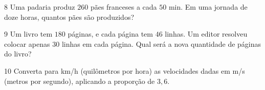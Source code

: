 




\bigskip

\num{8} Uma padaria produz $260$ pães franceses a cada $50$ min. Em uma jornada
de doze horas, quantos pães são produzidos?

\bigskip







\bigskip

\num{9} Um livro tem $180$ páginas, e cada página tem $46$ linhas. Um editor
resolveu colocar apenas $30$ linhas em cada página. Qual será a nova
quantidade de páginas do livro?

\bigskip








\bigskip

\num{10} Converta para km/h (quilômetros por hora) as velocidades
dadas em m/s (metros por segundo), aplicando a proporção de $3,6$.

